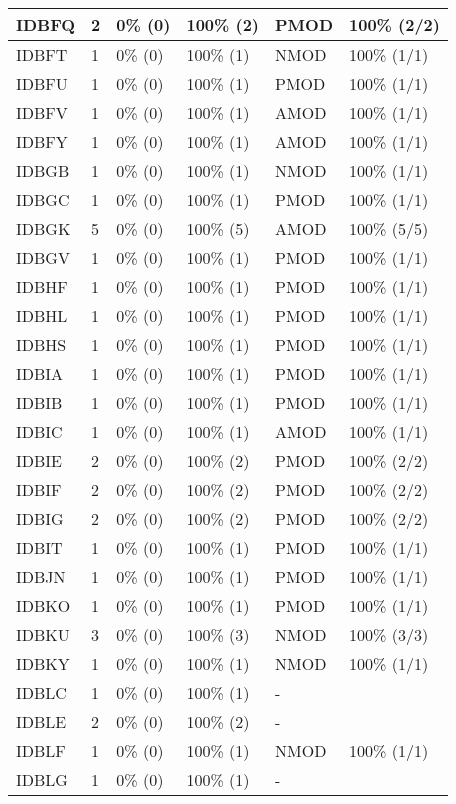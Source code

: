 \begin{figure*}
\begin{tabular}{|l|l|l|l||l|l|}
\hline
 IDBFQ & 2 & 0\% (0) & 100\% (2) & PMOD & 100\% (2/2) \\ 
\hline
 IDBFT & 1 & 0\% (0) & 100\% (1) & NMOD & 100\% (1/1) \\ 
\hline
 IDBFU & 1 & 0\% (0) & 100\% (1) & PMOD & 100\% (1/1) \\ 
\hline
 IDBFV & 1 & 0\% (0) & 100\% (1) & AMOD & 100\% (1/1) \\ 
\hline
 IDBFY & 1 & 0\% (0) & 100\% (1) & AMOD & 100\% (1/1) \\ 
\hline
 IDBGB & 1 & 0\% (0) & 100\% (1) & NMOD & 100\% (1/1) \\ 
\hline
 IDBGC & 1 & 0\% (0) & 100\% (1) & PMOD & 100\% (1/1) \\ 
\hline
 IDBGK & 5 & 0\% (0) & 100\% (5) & AMOD & 100\% (5/5) \\ 
\hline
 IDBGV & 1 & 0\% (0) & 100\% (1) & PMOD & 100\% (1/1) \\ 
\hline
 IDBHF & 1 & 0\% (0) & 100\% (1) & PMOD & 100\% (1/1) \\ 
\hline
 IDBHL & 1 & 0\% (0) & 100\% (1) & PMOD & 100\% (1/1) \\ 
\hline
 IDBHS & 1 & 0\% (0) & 100\% (1) & PMOD & 100\% (1/1) \\ 
\hline
 IDBIA & 1 & 0\% (0) & 100\% (1) & PMOD & 100\% (1/1) \\ 
\hline
 IDBIB & 1 & 0\% (0) & 100\% (1) & PMOD & 100\% (1/1) \\ 
\hline
 IDBIC & 1 & 0\% (0) & 100\% (1) & AMOD & 100\% (1/1) \\ 
\hline
 IDBIE & 2 & 0\% (0) & 100\% (2) & PMOD & 100\% (2/2) \\ 
\hline
 IDBIF & 2 & 0\% (0) & 100\% (2) & PMOD & 100\% (2/2) \\ 
\hline
 IDBIG & 2 & 0\% (0) & 100\% (2) & PMOD & 100\% (2/2) \\ 
\hline
 IDBIT & 1 & 0\% (0) & 100\% (1) & PMOD & 100\% (1/1) \\ 
\hline
 IDBJN & 1 & 0\% (0) & 100\% (1) & PMOD & 100\% (1/1) \\ 
\hline
 IDBKO & 1 & 0\% (0) & 100\% (1) & PMOD & 100\% (1/1) \\ 
\hline
 IDBKU & 3 & 0\% (0) & 100\% (3) & NMOD & 100\% (3/3) \\ 
\hline
 IDBKY & 1 & 0\% (0) & 100\% (1) & NMOD & 100\% (1/1) \\ 
\hline
 IDBLC & 1 & 0\% (0) & 100\% (1) & - &  \\ 
\hline
 IDBLE & 2 & 0\% (0) & 100\% (2) & - &  \\ 
\hline
 IDBLF & 1 & 0\% (0) & 100\% (1) & NMOD & 100\% (1/1) \\ 
\hline
 IDBLG & 1 & 0\% (0) & 100\% (1) & - &  \\ 
\hline
\end{tabular}
\end{figure*}
